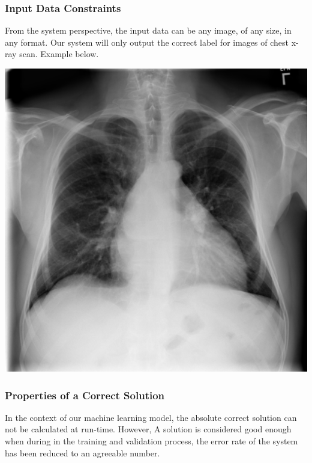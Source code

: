 \documentclass[12pt]{article}
\begin{document}
\subsubsection{Input Data Constraints} \label{sec_DataConstraints} 
From the system perspective, the input data can be any image, of any size, in any format. Our system will only output the correct label for images of chest x-ray scan. Example below.
\begin{center}
    \includegraphics[scale=0.3]{chest-x-ray.png}
\end{center}

\subsubsection{Properties of a Correct Solution} \label{sec_CorrectSolution}
In the context of our machine learning model, the absolute correct solution can not be calculated at run-time. However, A solution is considered good enough when during in the training and validation process,  the error rate of the system has been reduced to an agreeable number.
\end{document}
